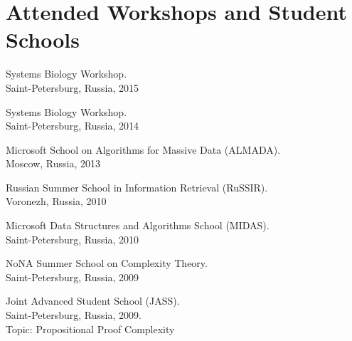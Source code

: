 \section{Attended Workshops and Student Schools}
%
\begin{innerlist}

\item Systems Biology Workshop. \\
Saint-Petersburg, Russia, 2015

\item Systems Biology Workshop. \\
Saint-Petersburg, Russia, 2014

\item Microsoft School on Algorithms for Massive Data (ALMADA). \\
Moscow, Russia, 2013

% 
% 

\item Russian Summer School in Information Retrieval (RuSSIR).\\ 
Voronezh, Russia, 2010

\item Microsoft Data Structures and Algorithms School (MIDAS).\\ 
Saint-Petersburg, Russia, 2010

\item NoNA Summer School on Complexity Theory.\\
Saint-Petersburg, Russia, 2009

\item Joint Advanced Student School (JASS).\\
Saint-Petersburg, Russia, 2009.\\ 
Topic: Propositional Proof Complexity

\end{innerlist}
